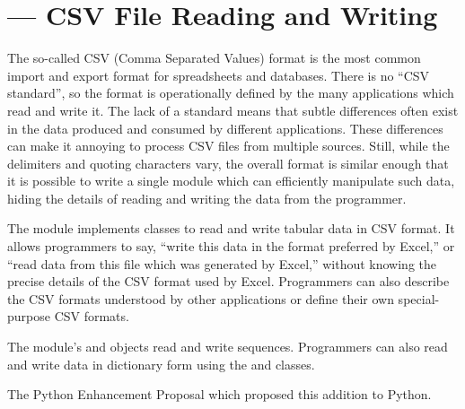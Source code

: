 \section{ --- CSV File Reading and Writing}



The so-called CSV (Comma Separated Values) format is the most common import
and export format for spreadsheets and databases.  There is no ``CSV
standard'', so the format is operationally defined by the many applications
which read and write it.  The lack of a standard means that subtle
differences often exist in the data produced and consumed by different
applications.  These differences can make it annoying to process CSV files
from multiple sources.  Still, while the delimiters and quoting characters
vary, the overall format is similar enough that it is possible to write a
single module which can efficiently manipulate such data, hiding the details
of reading and writing the data from the programmer.

The  module implements classes to read and write tabular data in
CSV format.  It allows programmers to say, ``write this data in the format
preferred by Excel,'' or ``read data from this file which was generated by
Excel,'' without knowing the precise details of the CSV format used by
Excel.  Programmers can also describe the CSV formats understood by other
applications or define their own special-purpose CSV formats.

The  module's  and  objects read and
write sequences.  Programmers can also read and write data in dictionary
form using the  and  classes.


\begin{seealso}
         {The Python Enhancement Proposal which proposed this addition
          to Python.}
\end{seealso}


